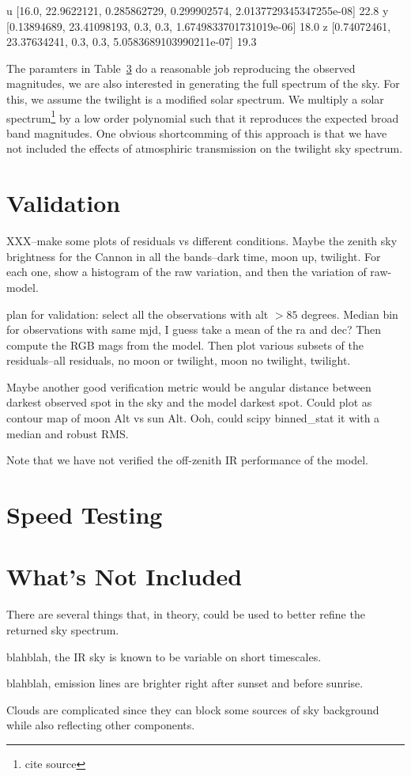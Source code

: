 \documentclass{emulateapj}  %
\begin{document}
u [16.0, 22.9622121, 0.285862729, 0.299902574, 2.0137729345347255e-08] 22.8
y [0.13894689, 23.41098193, 0.3, 0.3, 1.6749833701731019e-06] 18.0
z [0.74072461, 23.37634241, 0.3, 0.3, 5.0583689103990211e-07] 19.3


The paramters in Table~\ref{} do a reasonable job reproducing the observed magnitudes, we are also interested in generating the full spectrum of the sky.  For this, we assume the twilight is a modified solar spectrum.  We multiply a solar spectrum\footnote{cite source} by a low order polynomial such that it reproduces the expected broad band magnitudes.  One obvious shortcomming of this approach is that we have not included the effects of atmosphiric transmission on the twilight sky spectrum.  


\section{Validation}

XXX--make some plots of residuals vs different conditions.  Maybe the zenith sky brightness for the Cannon in all the bands--dark time, moon up, twilight.  For each one, show a histogram of the raw variation, and then the variation of raw-model.  

plan for validation:
select all the observations with alt $>85$ degrees. Median bin for observations with same mjd, I guess take a mean of the ra and dec? Then compute the RGB mags from the model.  Then plot various subsets of the residuals--all residuals, no moon or twilight, moon no twilight, twilight.

Maybe another good verification metric would be angular distance between darkest observed spot in the sky and the model darkest spot.  Could plot as contour map of moon Alt vs sun Alt.  Ooh, could scipy binned\_stat it with a median and robust RMS.


Note that we have not verified the off-zenith IR performance of the model.  

\section{Speed Testing}



\section{What's Not Included}

There are several things that, in theory, could be used to better refine the returned sky spectrum.

blahblah, the IR sky is known to be variable on short timescales.

blahblah, emission lines are brighter right after sunset and before sunrise.

Clouds are complicated since they can block some sources of sky background while also reflecting other components.  



\end{document}
